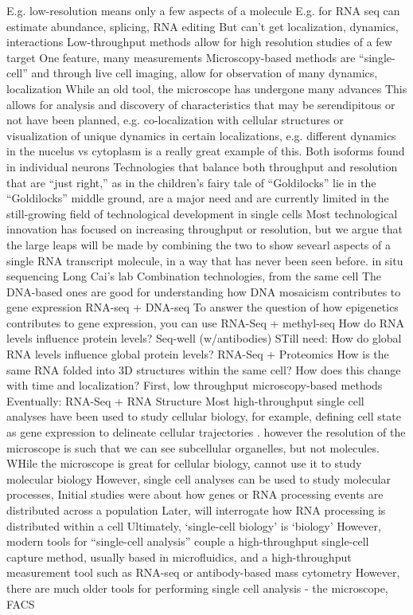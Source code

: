 E.g. low-resolution means only a few aspects of a molecule
E.g. for RNA seq can estimate abundance, splicing, RNA editing
But can't get localization, dynamics, interactions
Low-throughput methods allow for high resolution studies of a few target
One feature, many measurements
Microscopy-based methods are ``single-cell'' and through live cell imaging, allow for observation of many dynamics, localization
While an old tool, the microscope has undergone many advances
This allows for analysis and discovery of characteristics that may be serendipitous or not have been planned, e.g. co-localization with cellular structures or visualization of unique dynamics in certain localizations, e.g. different dynamics in the nucelus vs cytoplasm \cite{Yap:2016bs,Yap:2016ig} is a really great example of this. Both isoforms found in individual neurons
Technologies that balance both throughput and resolution that are ``just right,'' as in the children's fairy tale of ``Goldilocks'' 
lie in the ``Goldilocks'' middle ground, are a major need and are currently limited in the still-growing field of technological development in single cells
Most technological innovation has focused on increasing throughput or resolution, but we argue that the large leaps will be made by combining the two to show sevearl aspects of a single RNA transcript molecule, in a way that has never been seen before.
in situ sequencing Long Cai's lab \cite{Shah:2016iy}
Combination technologies, from the same cell
The DNA-based ones are good for understanding how DNA mosaicism contributes to gene expression
RNA-seq + DNA-seq
To answer the question of how epigenetics contributes to gene expression, you can use RNA-Seq + methyl-seq
How do RNA levels influence protein levels?
Seq-well (w/antibodies) \cite{Gierahn2017-ko}
STill need:
How do global RNA levels influence global protein levels?
RNA-Seq + Proteomics 
How is the same RNA folded into 3D structures within the same cell? How does this change with time and localization?
First, low throughput microscopy-based methods
Eventually: RNA-Seq + RNA Structure
Most high-throughput single cell analyses have been used to study cellular biology, for example, defining cell state as gene expression to delineate cellular trajectories \cite{Cannoodt2016-mt}.
however the resolution of the microscope is such that we can see subcellular organelles, but not molecules. 
WHile the microscope is great for cellular biology, cannot use it to study molecular biology
However, single cell analyses can be used to study molecular processes, 
Initial studies were about how genes or RNA processing events are distributed across a population
Later, will interrogate how RNA processing is distributed within a cell 
Ultimately, ‘single-cell biology' is ‘biology'
However, modern tools for ``single-cell analysis'' couple a high-throughput single-cell capture method, usually based in microfluidics, and a high-throughput measurement tool such as RNA-seq \cite{Ziegenhain:2017kr} or antibody-based mass cytometry \cite{Bendall2011-jm}
However, there are much older tools for performing single cell analysis - the microscope, FACS

